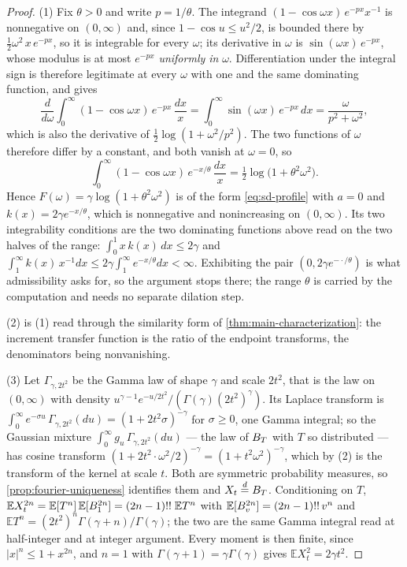 \begin{proof}
\leanok
(1) Fix $\theta > 0$ and write $p = 1/\theta$. The integrand
$(1 - \cos\omega x)\,e^{-px}x^{-1}$ is nonnegative on $(0,\infty)$ and, since
$1 - \cos u \le u^2/2$, is bounded there by $\tfrac12\omega^2\,x\,e^{-px}$, so it is integrable
for every $\omega$; its derivative in $\omega$ is $\sin(\omega x)\,e^{-px}$, whose modulus is at
most $e^{-px}$ \emph{uniformly in} $\omega$. Differentiation under the integral sign is
therefore legitimate at every $\omega$ with one and the same dominating function, and gives
\[
  \frac{d}{d\omega}\int_0^\infty (1 - \cos\omega x)\,e^{-px}\,\frac{dx}{x}
   = \int_0^\infty \sin(\omega x)\,e^{-px}\,dx = \frac{\omega}{p^2+\omega^2},
\]
which is also the derivative of $\tfrac12\log(1 + \omega^2/p^2)$. The two functions of $\omega$
therefore differ by a constant, and both vanish at $\omega = 0$, so
\[
  \int_0^\infty (1 - \cos\omega x)\,e^{-x/\theta}\,\frac{dx}{x}
   = \tfrac12\log\bigl(1 + \theta^2\omega^2\bigr).
\]
Hence $F(\omega) = \gamma\log(1+\theta^2\omega^2)$ is of the form \ref{eq:sd-profile} with
$a = 0$ and $k(x) = 2\gamma e^{-x/\theta}$, which is nonnegative and nonincreasing on
$(0,\infty)$. Its two integrability conditions are the two dominating functions above read on
the two halves of the range: $\int_0^1 x\,k(x)\,dx \le 2\gamma$ and
$\int_1^\infty k(x)\,x^{-1}dx \le 2\gamma\int_1^\infty e^{-x/\theta}dx < \infty$. Exhibiting the
pair $(0, 2\gamma e^{-\cdot/\theta})$ is what admissibility asks for, so the argument stops
there; the range $\theta$ is carried by the computation and needs no separate dilation step.

(2) is (1) read through the similarity form of \ref{thm:main-characterization}: the increment
transfer function is the ratio of the endpoint transforms, the denominators being nonvanishing.

(3) Let $\Gamma_{\gamma,2t^2}$ be the Gamma law of shape $\gamma$ and scale $2t^2$, that is the
law on $(0,\infty)$ with density $u^{\gamma-1}e^{-u/2t^2}/(\Gamma(\gamma)(2t^2)^{\gamma})$. Its
Laplace transform is $\int_0^\infty e^{-\sigma u}\,\Gamma_{\gamma,2t^2}(du) =
(1 + 2t^2\sigma)^{-\gamma}$ for $\sigma \ge 0$, one Gamma integral; so the Gaussian mixture
$\int_0^\infty g_u\,\Gamma_{\gamma,2t^2}(du)$ --- the law of $B_T$ with $T$ so distributed ---
has cosine transform $(1 + 2t^2\cdot\omega^2/2)^{-\gamma} = (1 + t^2\omega^2)^{-\gamma}$, which
by (2) is the transform of the kernel at scale $t$. Both are symmetric probability measures, so
\ref{prop:fourier-uniqueness} identifies them and $X_t \stackrel{d}{=} B_T$. Conditioning on $T$,
$\mathbb{E}X_t^{2n} = \mathbb{E}[T^n]\,\mathbb{E}[B_1^{2n}] = (2n-1)!!\;\mathbb{E}T^n$ with
$\mathbb{E}[B_v^{2n}] = (2n-1)!!\,v^n$ and
$\mathbb{E}T^n = (2t^2)^n\Gamma(\gamma+n)/\Gamma(\gamma)$; the two are the same Gamma integral
read at half-integer and at integer argument. Every moment is then finite, since
$|x|^n \le 1 + x^{2n}$, and $n = 1$ with $\Gamma(\gamma+1) = \gamma\Gamma(\gamma)$ gives
$\mathbb{E}X_t^2 = 2\gamma t^2$.


\end{proof}
